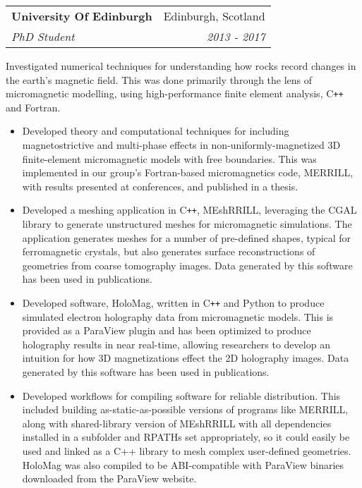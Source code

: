 \documentclass[11pt]{article}
\makeatletter
\newenvironment{resumeSubSectionHeader}{
    \par
    \begin{tabular*}{\textwidth}{l@{\extracolsep{\fill}}r}
    \par
} {
    \end{tabular*}
    \par
}
\newenvironment{resumeSubSectionBody}{
    \par
    \vspace{-0.4\parskip}
    \begin{small}
    \par
} {
    \par
    \end{small}
    \par
}
\newenvironment{resumeItemize}{
    \vspace{-0.5\baselineskip}
    \begin{itemize}
} {
    \end{itemize}
}
\makeatother
\begin{document}
%
%
\begin{resumeSubSectionHeader}

    \textbf{University Of Edinburgh}   & Edinburgh, Scotland \\
    \emph{PhD Student}                 & \emph{2013 - 2017}

\end{resumeSubSectionHeader}
\begin{resumeSubSectionBody}

    Investigated numerical techniques for understanding how rocks record
    changes in the earth's magnetic field. This was done primarily through
    the lens of micromagnetic modelling, using high-performance finite element
    analysis, C\verb!++! and Fortran.

    \begin{resumeItemize}
        \item
            Developed theory and computational techniques for including
            magnetostrictive and multi-phase effects in non-uniformly-magnetized
            3D finite-element micromagnetic models with free boundaries.  This
            was implemented in our group's Fortran-based micromagnetics code,
            MERRILL, with results presented at conferences, and published in a
            thesis.

        \item
            Developed a meshing application in C\verb!++!, MEshRRILL, leveraging
            the CGAL library to generate unstructured meshes for micromagnetic
            simulations.
            The application generates meshes for a number of pre-defined shapes,
            typical for ferromagnetic crystals, but also generates
            surface reconstructions of geometries from coarse tomography images.
            Data generated by this software has been used in publications.

        \item
            Developed software, HoloMag, written in C\verb!++! and Python to
            produce simulated electron holography data from micromagnetic
            models.
            This is provided as a ParaView plugin and has been optimized to
            produce holography results in near real-time, allowing researchers
            to develop an intuition for how 3D magnetizations effect the 2D
            holography images.
            Data generated by this software has been used in publications.

        \item
            Developed workflows for compiling software for reliable
            distribution.  This included building as-static-as-possible versions
            of programs like MERRILL, along with shared-library version of
            MEshRRILL with all dependencies installed in a subfolder and RPATHs
            set appropriately, so it could easily be used and linked as a C++
            library to mesh complex user-defined geometries.
            HoloMag was also compiled to be ABI-compatible with ParaView
            binaries downloaded from the ParaView website.
    \end{resumeItemize}


\end{resumeSubSectionBody}
\end{document}
